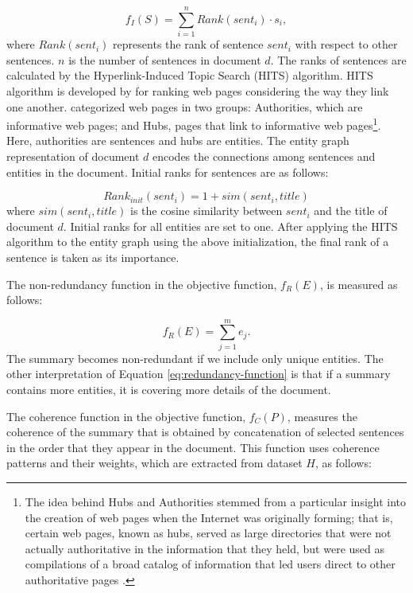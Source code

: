 \begin{equation}
f_I(S) = \sum_{i=1}^{n}{Rank(sent_i) \cdot s_i},
\end{equation}
%
where $Rank(sent_i)$ represents the rank of sentence $sent_i$ with respect to other sentences. $n$ is the number of sentences in document $d$.  
The ranks of sentences are calculated  by the \mbox{Hyperlink-Induced} Topic Search (HITS) algorithm.
HITS algorithm is developed by  for ranking web pages considering the way they link one another. 
 categorized web pages in two groups:  Authorities, which are informative web pages; and Hubs, pages that link to informative web pages\footnote{The idea behind Hubs and Authorities stemmed from a particular insight into the creation of web pages when the Internet was originally forming; that is, certain web pages, known as hubs, served as large directories that were not actually authoritative in the information that they held, but were used as compilations of a broad catalog of information that led users direct to other authoritative pages \cite{}.}.
Here, authorities are sentences and hubs are entities.  
The entity graph representation of document $d$ encodes the connections among sentences and entities in the document. 
Initial ranks for sentences are as follows:

\begin{equation}
Rank_{init}(sent_i)= 1 + sim (sent_i, title)
\end{equation}
where $sim(sent_i, title)$ is the cosine similarity between $sent_i$ and the title of document $d$. 
Initial ranks for all entities are set to one. 
After applying the HITS algorithm to the entity graph using the above initialization, the final rank of a sentence is taken as its importance. 

The non-redundancy function in the objective function, $f_R(E)$,    
is measured as follows:

\begin{equation}
\label{eq:redundancy-function}
f_R(E) = \sum_{j=1}^{m}{e_j}. 
\end{equation}
The summary becomes non-redundant if we include only unique entities.
The other interpretation of Equation \ref{eq:redundancy-function} is that if a summary contains more entities, it is covering more details of the document. 

The coherence function in the objective function, $f_C(P)$, measures the coherence of the summary that is obtained by concatenation of selected sentences in the order that they appear in the document. 
This function uses coherence patterns and their weights, which are extracted from dataset $H$, as follows:

